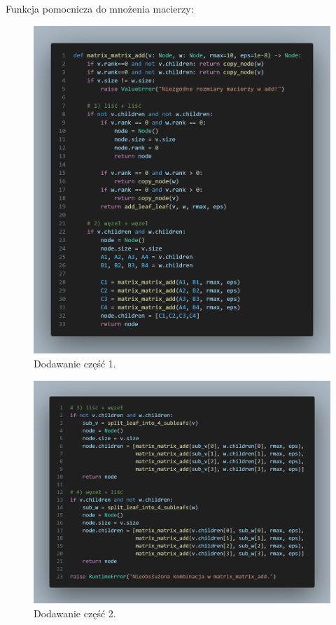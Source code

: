 \documentclass[11pt, leqno]{scrartcl}
\begin{document}
    \subsection*{}
    Funkcja pomocnicza do mnożenia macierzy:
    \begin{figure}[H]
        \centering
        \includegraphics[width=1\linewidth]{matrix_add1.png}
        \caption{Dodawanie część 1.}
    \end{figure}
    \begin{figure}[H]
        \centering
        \includegraphics[width=1\linewidth]{matrix_add2.png}
        \caption{Dodawanie część 2.}
    \end{figure}
\end{document}
